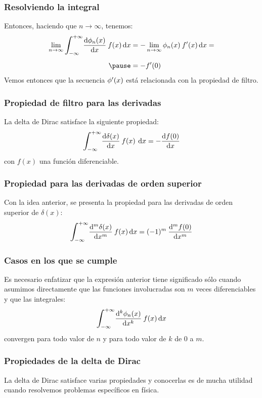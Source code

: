 \documentclass[12pt]{beamer}
\begin{document}
\begin{frame}
\frametitle{Resolviendo la integral}
Entonces, haciendo que $n \to \infty$, tenemos:
\pause
\begin{eqnarray*}
\begin{aligned}
\lim_{n \to \infty} \scaleint{6ex}_{\bs -\infty}^{+\infty} \dv{\phi_{n}(x)}{x} \: f (x) \dd{x} &= - \lim_{n \to \infty} \phi_{n}(x) \: \pderivada{f} (x) \dd{x} =  \\[0.5em] \pause
&= - \pderivada{f} (0)
\end{aligned}
\end{eqnarray*}
\pause
Vemos entonces que la secuencia ${\phi}^{\prime} (x)$ está relacionada con la propiedad de filtro.
\end{frame}
\begin{frame}
\frametitle{Propiedad de filtro para las derivadas}
La delta de Dirac satisface la siguiente propiedad:
\pause
\begin{align*}
\scaleint{6ex}_{\bs -\infty}^{+\infty} \dv{\delta(x)}{x} \: f (x) \: \dd{x} = - \dv{f (0)}{x}
\end{align*}
con $f (x)$ una función diferenciable.
\end{frame}
\begin{frame}
\frametitle{Propiedad para las derivadas de orden superior}
Con la idea anterior, se presenta la propiedad para las derivadas de orden superior de $\delta (x)$:
\pause
\begin{align*}
\scaleint{6ex}_{\bs -\infty}^{+\infty} \dv[m]{\delta (x)}{x} \: f (x) \dd{x} =  (-1)^{m} \: \dv[m]{f (0)}{x}
\end{align*}
\end{frame}
\begin{frame}
\frametitle{Casos en los que se cumple}
Es necesario enfatizar que la expresión anterior tiene significado sólo cuando asumimos directamente que las funciones involucradas son $m$ veces diferenciables y que las integrales:
\pause
\begin{align*}
\scaleint{6ex}_{\bs -\infty}^{+\infty} \dv[k]{\phi_{n}(x)}{x} \: f (x) \dd{x}
\end{align*}
convergen para todo valor de $n$ y para todo valor de $k$ de $0$ a $m$.
\end{frame}
\begin{frame}
\frametitle{Propiedades de la delta de Dirac}
La delta de Dirac satisface varias propiedades y conocerlas es de mucha utilidad cuando resolvemos problemas específicos en física. 
\end{frame}
\end{document}
